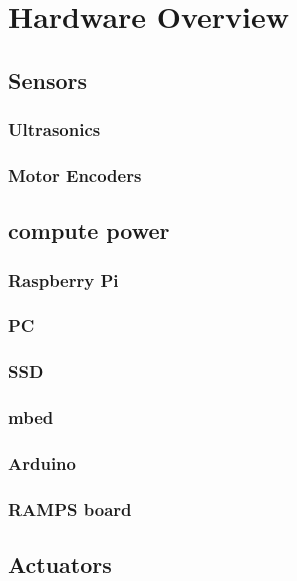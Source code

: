 \section{Hardware Overview}

\subsection{Sensors}
\subsubsection{Ultrasonics}
\subsubsection{Motor Encoders}

\subsection{compute power}
\subsubsection{Raspberry Pi}
\subsubsection{PC}
\subsubsection{SSD}
\subsubsection{mbed}
\subsubsection{Arduino}
\subsubsection{RAMPS board}

\subsection{Actuators}

